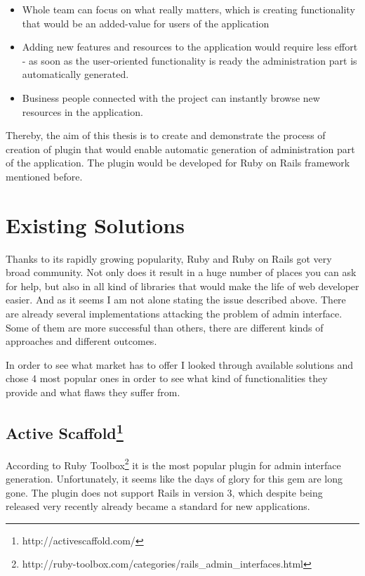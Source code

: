   \begin{itemize}
	  \item Whole team can focus on what really matters, which is creating functionality that would be an added-value for users of the application
	  \item Adding new features and resources to the application would require less effort - as soon as the user-oriented functionality is ready the administration part is automatically generated.
	  \item Business people connected with the project can instantly browse new resources in the application.
	\end{itemize}
  
  Thereby, the aim of this thesis is to create and demonstrate the process of creation of plugin that would enable automatic generation of administration part of the application. The plugin would be developed for Ruby on Rails framework mentioned before.
  
  \section{Existing Solutions}
  Thanks to its rapidly growing popularity, Ruby and Ruby on Rails got very broad community. Not only does it result in a huge number of places you can ask for help, but also in all kind of libraries that would make the life of web developer easier. And as it seems I am not alone stating the issue described above. There are already several implementations attacking the problem of admin interface. Some of them are more successful than others, there are different kinds of approaches and different outcomes. 
  
  In order to see what market has to offer I looked through available solutions and chose 4 most popular ones in order to see what kind of functionalities they provide and what flaws they suffer from. 
  
    \subsection[Active Scaffold] {Active Scaffold\footnote{http://activescaffold.com/}}
      According to Ruby Toolbox\footnote{http://ruby-toolbox.com/categories/rails\_admin\_interfaces.html} it is the most popular plugin for admin interface generation. Unfortunately, it seems like the days of glory for this gem are long gone. The plugin does not support Rails in version 3, which despite being released very recently already became a standard for new applications. 
      
